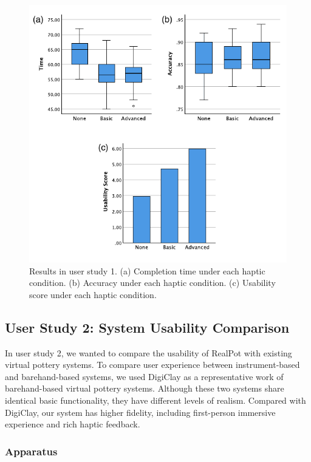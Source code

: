\documentclass{svjour3}                     %
\begin{document}
{\begin{figure}
	\includegraphics[width=\textwidth]{fig12.pdf}
	\caption{Results in user study 1. (a) Completion time under each haptic condition. (b) Accuracy under each haptic condition. (c) Usability score under each haptic condition.}
	\label{fig:r1}
\end{figure}



\subsection{User Study 2: System Usability Comparison}

In user study 2, we wanted to compare the usability of RealPot with existing virtual pottery systems.
%
To compare user experience between instrument-based and barehand-based systems, we used DigiClay \cite{gao2018digiclay} as a representative work of barehand-based virtual pottery systems.
Although these two systems share identical basic functionality, they have different levels of realism.
Compared with DigiClay, our system has higher fidelity, including first-person immersive experience and rich haptic feedback.
\subsubsection{Apparatus}

}
\end{document}
